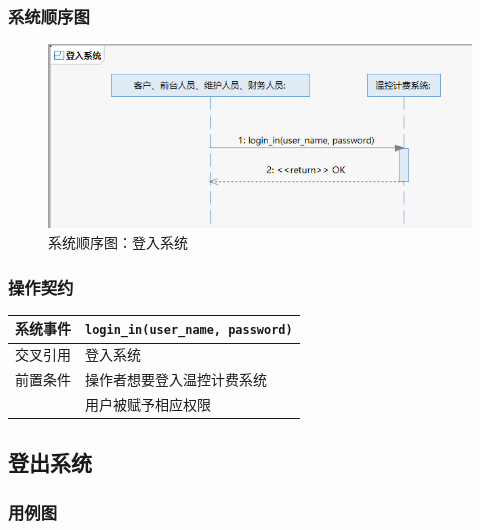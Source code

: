 \documentclass[black,normal,cn]{elegantnote}
\newcommand{\code}[1]{\colorbox{light-gray}{\texttt{#1}}}
\begin{document}
\subsubsection{系统顺序图}

\begin{figure}[H]
    \centering
    \includegraphics[width=.8\textwidth]{fig/276008.png}
    \caption{系统顺序图：登入系统}
    \label{fig:276008}
\end{figure}

\subsubsection{操作契约}

\begin{center}
    \begin{tabular}{|>{\centering}m{}|m{}|}
        \hline
        系统事件                  & \multicolumn{1}{l|}{\code{login\_in(user\_name, password)}} \\
        \hline
        交叉引用                  & 登入系统                                                    \\
        \hline
        前置条件                  & 操作者想要登入温控计费系统                                  \\
        \hline
        \multirow{1}{*}{后置条件} & 用户被赋予相应权限                                          \\
        \hline
    \end{tabular}
\end{center}

\subsection{登出系统}
\subsubsection{用例图}
\end{document}
